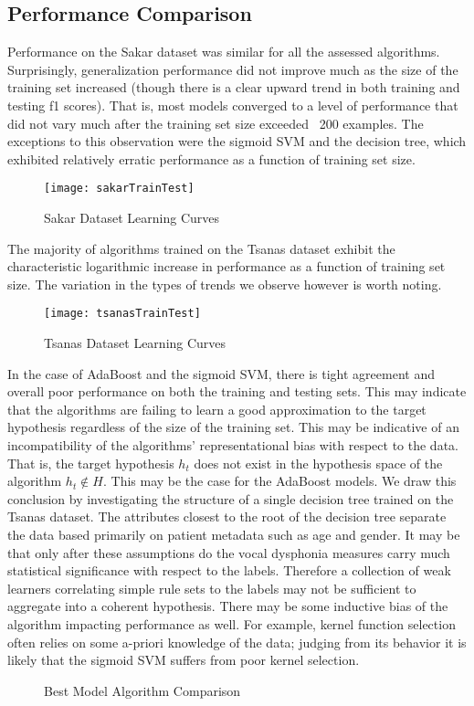 \documentclass[12pt]{article}
\begin{document}
\subsection{Performance Comparison}
Performance on the Sakar dataset was similar for all the assessed algorithms. Surprisingly, generalization performance did not improve much as the size of the training set increased (though there is a clear upward trend in both training and testing f1 scores). That is, most models converged to a level of performance that did not vary much after the training set size exceeded ~200 examples. The exceptions to this observation were the sigmoid SVM and the decision tree, which exhibited relatively erratic performance as a function of training set size.
\begin{figure}
    \centering
    \texttt{[image: sakarTrainTest]}
    \caption{Sakar Dataset Learning Curves}
\end{figure}
The majority of algorithms trained on the Tsanas dataset exhibit the characteristic logarithmic increase in performance as a function of training set size. The variation in the types of trends we observe however is worth noting.
\begin{figure}
    \centering
    \texttt{[image: tsanasTrainTest]}
    \caption{Tsanas Dataset Learning Curves}
\end{figure}
In the case of AdaBoost and the sigmoid SVM, there is tight agreement and overall poor performance on both the training and testing sets. This may indicate that the algorithms are failing to learn a good approximation to the target hypothesis regardless of the size of the training set. This may be indicative of an incompatibility of the algorithms' representational bias with respect to the data. That is, the target hypothesis $h_t$ does not exist in the hypothesis space of the algorithm $h_t \notin H$. This may be the case for the AdaBoost models. We draw this conclusion by investigating the structure of a single decision tree trained on the Tsanas dataset. The attributes closest to the root of the decision tree separate the data based primarily on patient metadata such as age and gender. It may be that only after these assumptions do the vocal dysphonia measures carry much statistical significance with respect to the labels. Therefore a collection of weak learners correlating simple rule sets to the labels may not be sufficient to aggregate into a coherent hypothesis.  There may be some inductive bias of the algorithm impacting performance as well. For example, kernel function selection often relies on some a-priori knowledge of the data; judging from its behavior it is likely that the sigmoid SVM suffers from poor kernel selection.
\begin{figure}%
    \centering
    \qquad
    \caption{Best Model Algorithm Comparison}
    \label{fig:algorithm_perf}%
\end{figure}
\end{document}
